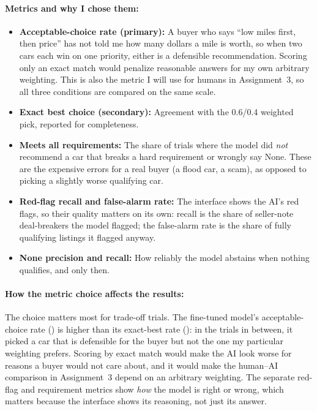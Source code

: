 \documentclass[11pt]{article}
\begin{document}
\paragraph{Metrics and why I chose them:}
\begin{itemize}
  \item \textbf{Acceptable-choice rate (primary):} A buyer who says ``low miles first, then price''
  has not told me how many dollars a mile is worth, so when two cars each win on one priority,
  either is a defensible recommendation. Scoring only an exact match would penalize reasonable
  answers for my own arbitrary weighting. This is also the metric I will use for humans in
  Assignment~3, so all three conditions are compared on the same scale.
  \item \textbf{Exact best choice (secondary):} Agreement with the 0.6/0.4 weighted pick, reported
  for completeness.
  \item \textbf{Meets all requirements:} The share of trials where the model did \emph{not}
  recommend a car that breaks a hard requirement or wrongly say None. These are the expensive
  errors for a real buyer (a flood car, a scam), as opposed to picking a slightly worse qualifying car.
  \item \textbf{Red-flag recall and false-alarm rate:} The interface shows the AI's red flags, so
  their quality matters on its own: recall is the share of seller-note deal-breakers the model
  flagged; the false-alarm rate is the share of fully qualifying listings it flagged anyway.
  \item \textbf{None precision and recall:} How reliably the model abstains when nothing qualifies,
  and only then.
\end{itemize}

\paragraph{How the metric choice affects the results:} The choice matters most for trade-off
trials. The fine-tuned model's acceptable-choice rate (\FtAcc{}) is higher than its exact-best rate
(\FtBest{}): in the trials in between, it picked a car that is defensible for the buyer but not the
one my particular weighting prefers. Scoring by exact match would make the AI look worse for
reasons a buyer would not care about, and it would make the human--AI comparison in Assignment~3
depend on an arbitrary weighting. The separate red-flag and requirement metrics show \emph{how}
the model is right or wrong, which matters because the interface shows its reasoning, not just its
answer.
\end{document}
